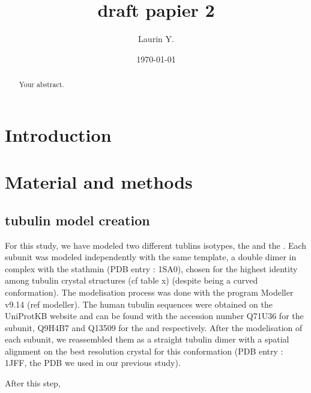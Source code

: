\documentclass[a4paper]{article}
\title{draft papier 2}
\author{Laurin Y.}
\date{\today}
\begin{document}
\maketitle

\begin{abstract}
Your abstract.
\end{abstract}

\section{Introduction}

\section{Material and methods}

\subsection{tubulin model creation}


For this study, we have modeled two different tublins isotypes, the  and the . Each
subunit was modeled independently with the same template, a double dimer in complex with the stathmin 
(PDB entry : 1SA0), chosen for the highest identity among tubulin crystal structures (cf table x) (despite 
being a curved conformation). The modelisation process was done with the program Modeller v9.14 (ref modeller).
The human tubulin sequences were obtained on the UniProtKB website and can be found with the accession number 
Q71U36 for the \alpha subunit, Q9H4B7 and Q13509 for the  and  respectively. After the modelisation 
of each subunit, we reassembled them as a straight tubulin dimer with a spatial alignment on the best resolution 
crystal for this conformation (PDB entry : 1JFF, the PDB we used in our previous study).

After this step, 
\end{document}
